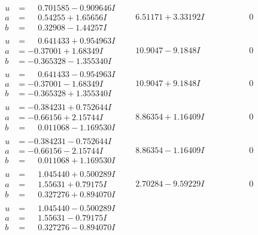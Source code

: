 \documentclass[1p]{elsarticle_modified}
\theoremstyle{definition}
\begin{document}
$$\begin{array}{c|c|c}
\begin{aligned}
u &= \phantom{-}0.701585 - 0.909646 I \\
a &= \phantom{-}0.54255 + 1.65656 I \\
b &= \phantom{-}0.32908 - 1.44257 I\end{aligned}
 & \phantom{-}6.51171 + 3.33192 I & \phantom{-0.000000 } 0 \\ \hline\begin{aligned}
u &= \phantom{-}0.641433 + 0.954963 I \\
a &= -0.37001 + 1.68349 I \\
b &= -0.365328 - 1.355340 I\end{aligned}
 & \phantom{-}10.9047 - 9.1848 I & \phantom{-0.000000 } 0 \\ \hline\begin{aligned}
u &= \phantom{-}0.641433 - 0.954963 I \\
a &= -0.37001 - 1.68349 I \\
b &= -0.365328 + 1.355340 I\end{aligned}
 & \phantom{-}10.9047 + 9.1848 I & \phantom{-0.000000 } 0 \\ \hline\begin{aligned}
u &= -0.384231 + 0.752644 I \\
a &= -0.66156 + 2.15744 I \\
b &= \phantom{-}0.011068 - 1.169530 I\end{aligned}
 & \phantom{-}8.86354 + 1.16409 I & \phantom{-0.000000 } 0 \\ \hline\begin{aligned}
u &= -0.384231 - 0.752644 I \\
a &= -0.66156 - 2.15744 I \\
b &= \phantom{-}0.011068 + 1.169530 I\end{aligned}
 & \phantom{-}8.86354 - 1.16409 I & \phantom{-0.000000 } 0 \\ \hline\begin{aligned}
u &= \phantom{-}1.045440 + 0.500289 I \\
a &= \phantom{-}1.55631 + 0.79175 I \\
b &= \phantom{-}0.327276 + 0.894070 I\end{aligned}
 & \phantom{-}2.70284 - 9.59229 I & \phantom{-0.000000 } 0 \\ \hline\begin{aligned}
u &= \phantom{-}1.045440 - 0.500289 I \\
a &= \phantom{-}1.55631 - 0.79175 I \\
b &= \phantom{-}0.327276 - 0.894070 I\end{aligned}

\end{array}$$
\end{document}

